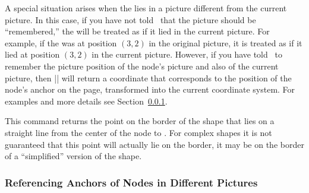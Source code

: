 \begin{command}{\pgfpointanchor{}}
\begin{codeexample}[]
\begin{pgfpicture}
  {
    \pgftransformreset
    \xdef\mycoordinate{\noexpand\pgfpoint{\the\pgf@x}{\the\pgf@y}}
  }
    
  \pgfpathcircle{\mycoordinate}{2pt}
\end{pgfpicture}
\end{codeexample}

  A special situation arises when the  lies in a picture
  different from the current picture. In this case, if you have not
  told \pgfname\ that the picture should be ``remembered,'' the
   will be treated as if it lied in the current
  picture. For example, if the  was at position $(3,2)$ in
  the original picture, it is treated as if it lied at position
  $(3,2)$ in the current picture. However, if you have told \pgfname\
  to remember the picture position of the node's picture and also of
  the current picture,
  then |\pgfpointanchor| will return a coordinate that corresponds to
  the position of the node's anchor on the page, transformed into the
  current coordinate system. For examples and more details see
  Section~\ref{section-cross-pictures-pgf}. 
\end{command}

\begin{command}{\pgfpointshapeborder{}}
  This command returns the point on the border of the shape that lies
  on a straight line from the center of the node to \meta{point}. For
  complex shapes it is not guaranteed that this point will actually
  lie on the border, it may be on the border of a ``simplified''
  version of the shape.

\begin{codeexample}[]
\begin{pgfpicture}
  \begin{pgfscope}
  \end{pgfscope}
  \pgfpathcircle{\pgfpoint{2cm}{1cm}}{2pt}
  \pgfpathcircle{\pgfpoint{-1cm}{1cm}}{2pt}
\end{pgfpicture}
\end{codeexample}
\end{command}


\subsubsection{Referencing Anchors of Nodes in Different Pictures}
\label{section-cross-pictures-pgf}

